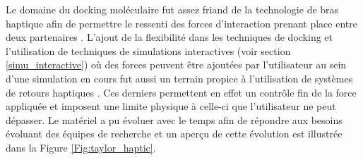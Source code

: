 Le domaine du docking moléculaire fut assez friand de la technologie de bras haptique afin de permettre le ressenti des forces d'interaction prenant place entre deux partenaires \cite{nagata2002concept, sankaranarayanan2003role}. L'ajout de la flexibilité dans les techniques de docking et l'utilisation de techniques de simulations interactives (voir section \ref{simu_interactive}) où des forces peuvent être ajoutées par l'utilisateur au sein d'une simulation en cours fut aussi un terrain propice à l'utilisation de systèmes de retours haptiques \cite{stone2001system}. Ces derniers permettent en effet un contrôle fin de la force appliquée et imposent une limite physique à celle-ci que l'utilisateur ne peut dépasser. Le matériel a pu évoluer avec le temps afin de répondre aux besoins évoluant des équipes de recherche et un aperçu de cette évolution est illustrée dans la Figure \ref{Fig:taylor_haptic}.

